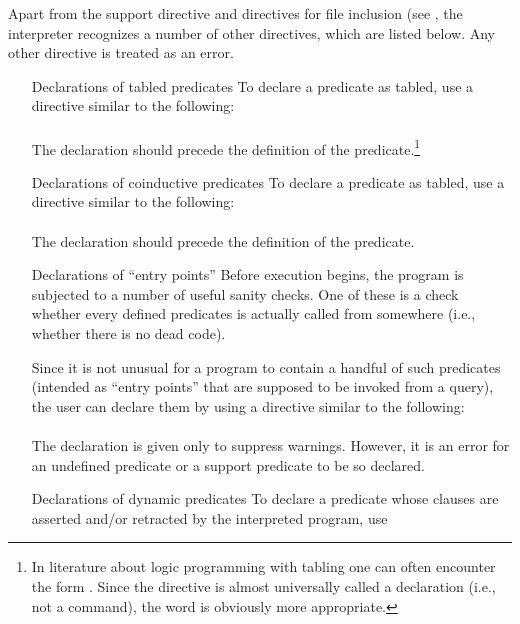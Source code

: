 Apart from the support directive and directives for file inclusion (see
, the interpreter recognizes a number of other
directives, which are listed below.  Any other directive is treated as an
error.
\begin{itemize}

\item [Declarations of tabled predicates]
  To declare a predicate as tabled, use a directive similar to the following:\\
  \ind{}\\
  The declaration should precede the definition of the predicate.\footnote{
    In literature about logic programming with tabling one can often
    encounter the form .  Since the directive is
    almost universally called a declaration (i.e., not a command), the word
     is obviously more appropriate.}

\item [Declarations of coinductive predicates]
  To declare a predicate as tabled, use a directive similar to the following:\\
  \ind{}\\
  The declaration should precede the definition of the predicate.

\item [Declarations of ``entry points'']
  Before execution begins, the program is subjected to a number of useful
  sanity checks.  One of these is a check whether every defined predicates
  is actually called from somewhere (i.e., whether there is no dead code).

  Since it is not unusual for a program to contain a handful of such
  predicates (intended as ``entry points'' that are supposed to be invoked
  from a query), the user can declare them by using a directive similar to
  the following:\\
  \ind{}\\
  The declaration is given only to suppress warnings.  However, it is an
  error for an undefined predicate or a support predicate to be so declared.

\item[Declarations of dynamic predicates]
  To declare a predicate whose clauses are asserted and/or retracted by the
  interpreted program, use\\
  \ind{}


\end{itemize}
